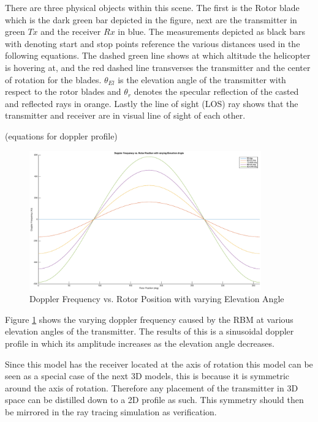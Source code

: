There are three physical objects within this scene. The first is the Rotor blade which is the dark green bar depicted in the figure, next are the transmitter in green $Tx$ and the receiver $Rx$ in blue. The measurements depicted as black bars with denoting start and stop points reference the various distances used in the following equations. The dashed green line shows at which altitude the helicopter is hovering at, and the red dashed line transverses the transmitter and the center of rotation for the blades. $\theta_{El}$ is the elevation angle of the transmitter with respect to the rotor blades and $\theta_r$ denotes the specular reflection of the casted and reflected rays in orange. Lastly the line of sight (LOS) ray shows that the transmitter and receiver are in visual line of sight of each other.

(equations for doppler profile)

\begin{figure}
	\begin{center}
		\includegraphics[width=10cm]{images/background/2d_theoretical_doppler_profile.eps}
		\caption{Doppler Frequency vs. Rotor Position with varying Elevation Angle}
		\label{fig:2D_theoretical_doppler}
	\end{center}
\end{figure}

Figure \ref{fig:2D_theoretical_doppler} shows the varying doppler frequency caused by the RBM at various elevation angles of the transmitter. The results of this is a sinusoidal doppler profile in which its amplitude increases as the elevation angle decreases. 

Since this model has the receiver located at the axis of rotation this model can be seen as a special case of the next 3D models, this is because it is symmetric around the axis of rotation. Therefore any placement of the transmitter in 3D space can be distilled down to a 2D profile as such. This symmetry should then be mirrored in the ray tracing simulation as verification.

